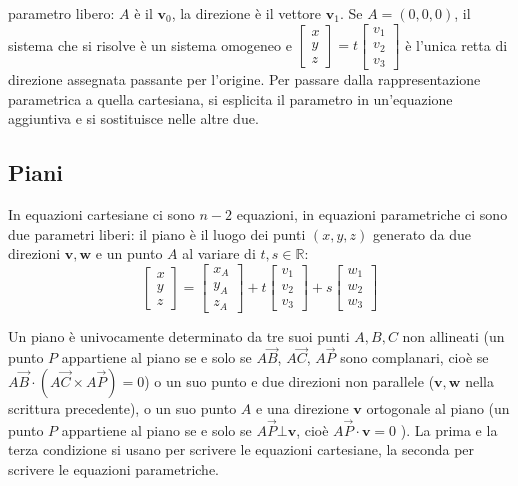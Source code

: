 \documentclass{article}
\begin{document}
parametro libero: $A$ \`{e} il $\mathbf{v}_{0}$, la direzione \`{e} il
vettore $\mathbf{v}_{1}$. Se $A=\left( 0,0,0\right) $, il sistema che si
risolve \`{e} un sistema omogeneo e $\left[ 
\begin{array}{c}
x \\ 
y \\ 
z%
\end{array}%
\right] =t\left[ 
\begin{array}{c}
v_{1} \\ 
v_{2} \\ 
v_{3}%
\end{array}%
\right] $ \`{e} l'unica retta di direzione assegnata passante per l'origine.
Per passare dalla rappresentazione parametrica a quella cartesiana, si
esplicita il parametro in un'equazione aggiuntiva e si sostituisce nelle
altre due.

\subsection{Piani}

In equazioni cartesiane ci sono $n-2$ equazioni, in equazioni parametriche
ci sono due parametri liberi: il piano \`{e} il luogo dei punti $\left(
x,y,z\right) $ generato da due direzioni $\mathbf{v,w}$ e un punto $A$ al
variare di $t,s\in 
\mathbb{R}
$:%
\begin{equation*}
\left[ 
\begin{array}{c}
x \\ 
y \\ 
z%
\end{array}%
\right] =\left[ 
\begin{array}{c}
x_{A} \\ 
y_{A} \\ 
z_{A}%
\end{array}%
\right] +t\left[ 
\begin{array}{c}
v_{1} \\ 
v_{2} \\ 
v_{3}%
\end{array}%
\right] +s\left[ 
\begin{array}{c}
w_{1} \\ 
w_{2} \\ 
w_{3}%
\end{array}%
\right]
\end{equation*}

Un piano \`{e} univocamente determinato da tre suoi punti $A,B,C$ non
allineati (un punto $P$ appartiene al piano se e solo se $A\vec{B}$, $A\vec{C%
}$, $A\vec{P}$ sono complanari, cio\`{e} se $A\vec{B}\cdot \left( A\vec{C}%
\times A\vec{P}\right) =0$) o un suo punto e due direzioni non parallele ($%
\mathbf{v,w}$ nella scrittura precedente), o un suo punto $A$ e una
direzione $\mathbf{v}$ ortogonale al piano (un punto $P$ appartiene al piano
se e solo se $A\vec{P}\bot \mathbf{v}$, cio\`{e} $A\vec{P}\cdot \mathbf{v}=0$%
). La prima e la terza condizione si usano per scrivere le equazioni
cartesiane, la seconda per scrivere le equazioni parametriche.
\end{document}
